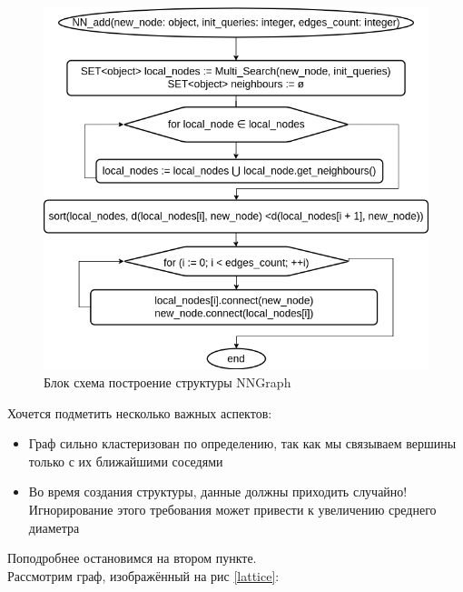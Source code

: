 \begin{figure}[H]
    \centering
    \includegraphics[scale=0.6]{./pictures/Ponomarenko_add_node.png}
    \caption{Блок схема построение структуры NNGraph} \label{Ponomarenko_graph_block_scheme}
\end{figure}

Хочется подметить несколько важных аспектов:
\begin{itemize}
    \item Граф сильно кластеризован по определению, так как мы связываем вершины только 
    с их ближайшими соседями
    \item Во время создания структуры, данные должны приходить случайно! Игнорирование 
    этого требования может привести к увеличению среднего диаметра
\end{itemize}

Поподробнее остановимся на втором пункте. \\ 
Рассмотрим граф, изображённый на рис \ref{lattice}:

